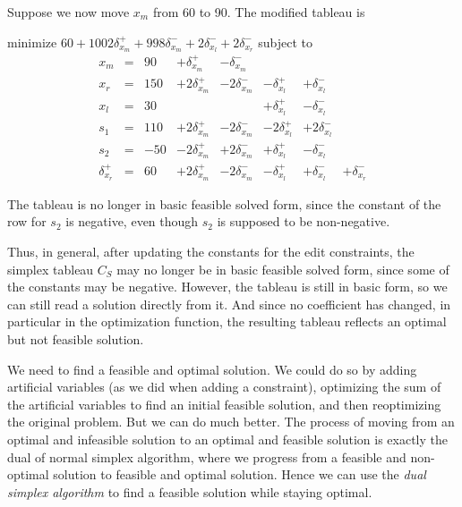\documentclass{uist96}
\begin{document}
Suppose we now move $x_m$ from 60 to 90.  
The modified tableau is 
\begin{trivlist}\item
minimize $60 + 1002 \delta_{x_m}^+ + 998 \delta_{x_m}^-  + 2
\delta_{x_l}^- + 2\delta_{x_r}^- $ 
subject to 
$$
\begin{array}{rlrrrrrr} 
x_m & = &90 &  + \delta_{x_m}^+ & - \delta_{x_m}^- \\
x_r & = &150 & + 2 \delta_{x_m}^+ & - 2\delta_{x_m}^- &
		- \delta_{x_l}^+ & + \delta_{x_l}^- \\ \hline
x_l & = & 30  & & & + \delta_{x_l}^+ & - \delta_{x_l}^- \\
s_1 & = &110 &  + 2 \delta_{x_m}^+ & - 2\delta_{x_m}^- &
		-2 \delta_{x_l}^+ & +2 \delta_{x_l}^- \\
s_2 & = &-50 &   - 2 \delta_{x_m}^+ &+2\delta_{x_m}^- &
		+ \delta_{x_l}^+ & - \delta_{x_l}^- \\
\delta_{x_r}^+ & = & 60 & + 2 \delta_{x_m}^+  & - 2\delta_{x_m}^- &
	- \delta_{x_l}^+ & + \delta_{x_l}^- & +\delta_{x_r}^-
\end{array}
$$
\end{trivlist}
The tableau is no longer in basic feasible solved form,
since the constant of the row 
for $s_2$ is negative, even though $s_2$ is supposed to be non-negative.

Thus, in general, after updating the constants for the edit constraints,
the simplex tableau $C_S$ may no longer be in basic feasible solved form,
since some of the constants may be negative.  However, the tableau is still
in basic form, so we can still
read a solution directly from it.
And since no coefficient has changed, in particular in the optimization
function, the resulting tableau reflects an optimal but not feasible solution.

We need to find a feasible and optimal solution.  We could do so by adding
artificial variables (as we did when adding a constraint), optimizing the
sum of the artificial variables to find an initial feasible solution, and
then reoptimizing the original problem.
But we can do much better.  The process of moving from an optimal and
infeasible solution to an optimal and feasible solution is exactly the dual
of normal simplex algorithm, where we progress from a feasible and
non-optimal solution to feasible and optimal solution.  Hence we can use
the \emph{dual simplex algorithm} to find a feasible solution while staying
optimal.
\end{document}

